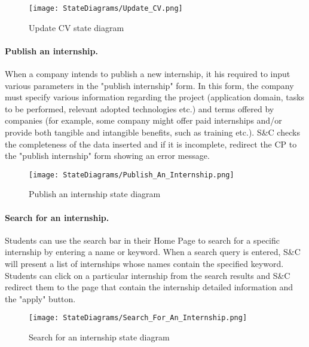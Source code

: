 \begin{figure}[H]
    \begin{center}
        \texttt{[image: StateDiagrams/Update\_CV.png]}
        \caption{Update CV state diagram}
        \label{fig:update_cv_sd}%
    \end{center}
\end{figure}

\paragraph{Publish an internship.}
When a company intends to publish a new internship, it his required to input various parameters in the "publish internship" form.
In this form, the company must specify various information regarding the project (application domain, tasks to be performed, relevant adopted technologies etc.) and terms offered by companies (for example, some company might offer paid internships and/or provide both tangible and intangible benefits, such as training etc.). 
S\&C checks the completeness of the data inserted and if it is incomplete, redirect the CP to the "publish internship" form showing an error message.

\begin{figure}[H]
    \begin{center}
        \texttt{[image: StateDiagrams/Publish\_An\_Internship.png]}
        \caption{Publish an internship state diagram}
        \label{fig:publish_an_internship_sd}%
    \end{center}
\end{figure}

\paragraph{Search for an internship.}
Students can use the search bar in their Home Page to search for a specific internship by entering a name or keyword. When a search query is entered, S\&C will present a list of internships whose names contain the specified keyword.
Students can click on a particular internship from the search results and S\&C redirect them to the page that contain the internship detailed information and the "apply" button.


\begin{figure}[H]
    \begin{center}
        \texttt{[image: StateDiagrams/Search\_For\_An\_Internship.png]}
        \caption{Search for an internship state diagram}
        \label{fig:search_for_an_internship_sd}%
    \end{center}
\end{figure}

